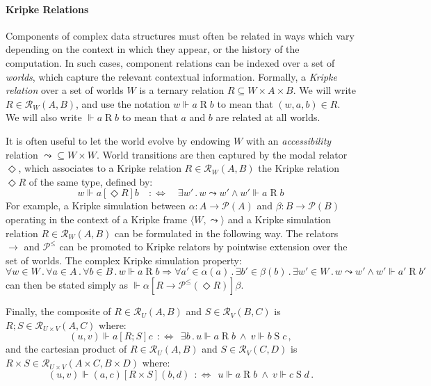 \documentclass[acmsmall,screen,review,anonymous]{acmart}
\newcommand{\ifr}[1]{\mathrel{[{#1}]}}
\begin{document}
\paragraph{Kripke Relations}

Components of complex data structures
must often be related in ways which vary
depending on the context in which they appear,
or the history of the computation.
In such cases,
component relations can be indexed over a set of \emph{worlds},
which capture the relevant contextual information.
Formally, a \emph{Kripke relation} over a set of worlds $W$
is a ternary relation $R \subseteq W \times A \times B$.
We will write $R \in \mathcal{R}_W(A, B)$,
and use the notation
$
  w \Vdash a \mathrel{R} b
$
to mean that $(w, a, b) \in R$.
We will also write
$\Vdash a \mathrel{R} b$
to mean that $a$ and $b$ are related at all worlds.

It is often useful to let the world evolve
by endowing $W$ with an \emph{accessibility} relation
${\leadsto} \subseteq W \times W$.
World transitions are then captured by the modal relator $\Diamond$,
which associates to a Kripke relation $R \in \mathcal{R}_W(A, B)$
the Kripke relation $\Diamond R$ of the same type, defined by:
\[
  w \Vdash a \ifr{\Diamond R} b
  \quad:\Leftrightarrow\quad
  \exists w' \mathbin. w \leadsto w' \wedge w' \Vdash a \mathrel{R} b
\]
For example,
a Kripke simulation between $\alpha : A \rightarrow \mathcal{P}(A)$
and $\beta : B \rightarrow \mathcal{P}(B)$
operating in the context of a Kripke frame $\langle W, {\leadsto} \rangle$
and a Kripke simulation relation $R \in \mathcal{R}_W(A, B)$
can be formulated in the following way.
The relators $\rightarrow$ and $\mathcal{P}^\le$
can be promoted to Kripke relators
by pointwise extension over the set of worlds.
The complex Kripke simulation property:
{\small
\[
  \forall w \in W \mathbin.
  \forall a \in A \mathbin.
  \forall b \in B \mathbin.
  w \Vdash a \mathrel{R} b \Rightarrow
  \forall a' \in \alpha(a) \mathbin.
  \exists b' \in \beta(b) \mathbin.
  \exists w' \in W \mathbin.
  w \leadsto w' \wedge w' \Vdash a' \mathrel{R} b'
\]
}
can then be stated simply as
$
  \Vdash \alpha \ifr{R \rightarrow \mathcal{P}^\le(\Diamond R)} \beta
$.

Finally,
the composite of
$R \in \mathcal{R}_U(A, B)$ and $S \in \mathcal{R}_V(B, C)$
is $R \mathbin; S \in \mathcal{R}_{U \times V}(A, C)$ where:
\[
  (u, v) \Vdash a \mathrel{[R \mathbin; S]} c \:\::\Leftrightarrow\:\:
  \exists b \mathbin.
    u \Vdash a \mathrel{R} b \:\wedge\: v \Vdash b \mathrel{S} c
  \,,
\]
and the cartesian product of $R \in \mathcal{R}_U(A, B)$ and
$S \in \mathcal{R}_V(C, D)$
is ${R \times S} \in \mathcal{R}_{U \times V}(A \times C, B \times D)$ where:
\[
  (u, v) \Vdash (a, c) \mathrel{[R \times S]} (b, d) \:\::\Leftrightarrow\:\:
  u \Vdash a \mathrel{R} b \:\wedge\: v \Vdash c \mathrel{S} d
  \,.
\]
\end{document}
